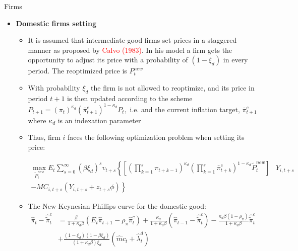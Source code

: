\documentclass[9pt]{beamer}
\let\olditem\item
\renewcommand{\item}{%
\olditem\vspace{\fill}}
\begin{document}
\begin{frame}{Firms}
\begin{itemize}
    \item \textbf{Domestic firms setting} 
    \begin{itemize}
        \item It is assumed that intermediate-good firms set prices in a staggered manner as proposed by \textcolor{red}{Calvo (1983)}. In his model a firm gets the opportunity to adjust its price with a probability of $\left( 1 - \xi_{d} \right)$ in every period. The reoptimized price is $P_t^{new}$
        
        \item With probability $\xi_{d}$ the firm is not allowed to reoptimize, and its price in period $t+1$ is then updated according to the scheme $P_{t+1}=\left(\pi_{t}\right)^{\kappa_{d}}\left(\bar{\pi}_{t+1}^{c}\right)^{1-\kappa_{d}} P_{t},$ i.e. and the current inflation target, $\bar{\pi}_{t+1}^{c}$ where $\kappa_{d}$ is an indexation parameter 
        
        \item Thus, firm $i$ faces the following optimization problem when setting its price:
        
$$\begin{aligned}
    \max _{\tilde{P}_{t}^{new}} E_{t} \sum_{s=0}^{\infty}\left(\beta \xi_{d}\right)^{s} v_{t+s}\left\{\left[\left(\prod_{k=1}^{s} \pi_{t+k-1}\right)^{\kappa_{d}}\left(\prod_{k=1}^{s} \bar{\pi}_{t+k}^{c}\right)^{1-\kappa_{d}} \tilde{P}_{t}^{new}\right]\right.& Y_{i, t+s} \\
    \left.-M C_{i, t+s}\left(Y_{i, t+s}+z_{t+s} \phi\right)\right\} &
    \end{aligned}
$$    

    \item The New Keynesian Phillips curve for the domestic good:
$$
    \begin{aligned}
    \hat{\pi}_{t}-\hat{\tilde{\pi}}_{t}^{c} &=\frac{\beta}{1+\kappa_{d} \beta}\left(E_{t} \hat{\pi}_{t+1}-\rho_{\pi} \hat{\pi}_{t}^{c}\right)+\frac{\kappa_{d}}{1+\kappa_{d} \beta}\left(\hat{\pi}_{t-1}-\hat{\tilde{\pi}}_{t}^{c}\right)-\frac{\kappa_{d} \beta\left(1-\rho_{\pi}\right)}{1+\kappa_{d} \beta} \hat{\tilde{\pi}}_{t}^{c} \\
    &+\frac{\left(1-\xi_{d}\right)\left(1-\beta \xi_{d}\right)}{\left(1+\kappa_{d} \beta\right) \xi_{d}}\left(\hat{m} c_{t}+\hat{\lambda}_{t}^{d}\right)
    \end{aligned}
$$
    
    
    
\end{itemize}
    
\end{itemize}


\end{frame}
\end{document}
